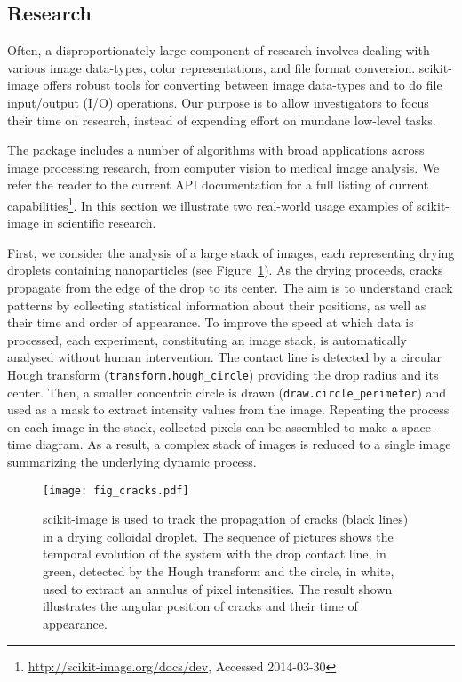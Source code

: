 
  \subsection*{Research}
    \label{sub:research}

    Often, a disproportionately large component of research involves dealing with various image data-types, color representations, and file format conversion. scikit-image offers robust tools for converting between image data-types \citep{DirectX,OpenGL,GraphicsGemsI} and to do file input/output (I/O) operations.  Our purpose is to allow investigators to focus their time on research, instead of expending effort on mundane low-level tasks.

    The package includes a number of algorithms with broad applications across image processing research, from computer vision to medical image analysis. We refer the reader to the current API documentation for a full listing of current capabilities\footnote{\url{http://scikit-image.org/docs/dev}, Accessed 2014-03-30}. In this section we illustrate two real-world usage examples of scikit-image in scientific research.

    First, we consider the analysis of a large stack of images, each representing drying droplets containing nanoparticles (see Figure~\ref{fig:cracks}). As the drying proceeds, cracks propagate from the edge of the drop to its center. The aim is to understand crack patterns by collecting statistical information about their positions, as well as their time and order of appearance. To improve the speed at which data is processed, each experiment, constituting an image stack, is automatically analysed without human intervention. The contact line is detected by a circular Hough transform (\texttt{transform.hough\_circle}) providing the drop radius and its center. Then, a smaller concentric circle is drawn (\texttt{draw.circle\_perimeter}) and used as a mask to extract intensity values from the image. Repeating the process on each image in the stack, collected pixels can be assembled to make a space-time diagram. As a result, a complex stack of images is reduced to a single image summarizing the underlying dynamic process.

    \begin{figure}[bht]
      \texttt{[image: fig\_cracks.pdf]}

      \caption{scikit-image is used to track the propagation of cracks (black lines) in a drying colloidal droplet. The sequence of pictures shows the temporal evolution of the system with the drop contact line, in green, detected by the Hough transform and the circle, in white, used to extract an annulus of pixel intensities.  The result shown illustrates the angular position of cracks and their time of appearance. \label{fig:cracks}}
    \end{figure}

